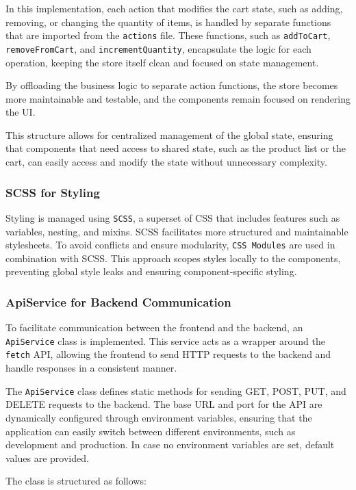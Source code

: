 In this implementation, each action that modifies the cart state, such as adding, removing, or changing the quantity of items, is handled by separate functions that are imported from the \texttt{actions} file. These functions, such as \texttt{addToCart}, \texttt{removeFromCart}, and \texttt{incrementQuantity}, encapsulate the logic for each operation, keeping the store itself clean and focused on state management.

By offloading the business logic to separate action functions, the store becomes more maintainable and testable, and the components remain focused on rendering the UI.

This structure allows for centralized management of the global state, ensuring that components that need access to shared state, such as the product list or the cart, can easily access and modify the state without unnecessary complexity.


\subsubsection{SCSS for Styling}
Styling is managed using \texttt{SCSS}, a superset of CSS that includes features such as variables, nesting, and mixins. SCSS facilitates more structured and maintainable stylesheets. To avoid conflicts and ensure modularity, \texttt{CSS Modules} are used in combination with SCSS. This approach scopes styles locally to the components, preventing global style leaks and ensuring component-specific styling.

\subsubsection{ApiService for Backend Communication}

To facilitate communication between the frontend and the backend, an \texttt{ApiService} class is implemented. This service acts as a wrapper around the \texttt{fetch} API, allowing the frontend to send HTTP requests to the backend and handle responses in a consistent manner.

The \texttt{ApiService} class defines static methods for sending GET, POST, PUT, and DELETE requests to the backend. The base URL and port for the API are dynamically configured through environment variables, ensuring that the application can easily switch between different environments, such as development and production. In case no environment variables are set, default values are provided.

The class is structured as follows:

